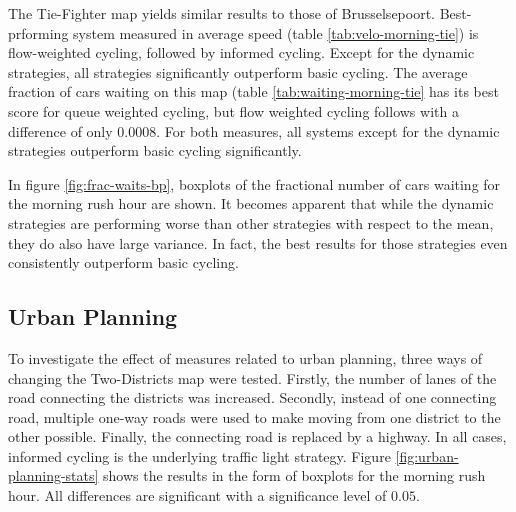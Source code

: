 \documentclass[11pt]{article}
\begin{document}
The Tie-Fighter map yields similar results to those of Brusselsepoort. Best-prforming system measured in average speed (table \ref{tab:velo-morning-tie}) is flow-weighted cycling, followed by informed cycling. Except for the dynamic strategies, all strategies significantly outperform basic cycling. The average fraction of cars waiting on this map (table \ref{tab:waiting-morning-tie} has its best score for queue weighted cycling, but flow weighted cycling follows with a difference of only 0.0008. For both measures, all systems except for the dynamic strategies outperform basic cycling significantly.

\vspace{20pt}

In figure \ref{fig:frac-waits-bp}, boxplots of the fractional number of cars waiting for the morning rush hour are shown. It becomes apparent that while the dynamic strategies are performing worse than other strategies with respect to the mean, they do also have large variance. In fact, the best results for those strategies even consistently outperform basic cycling.

\subsection{Urban Planning}
To investigate the effect of measures related to urban planning, three ways of changing the Two-Districts map were tested. Firstly, the number of lanes of the road connecting the districts was increased. Secondly, instead of one connecting road, multiple one-way roads were used to make moving from one district to the other possible. Finally, the connecting road is replaced by a highway. In all cases, informed cycling is the underlying traffic light strategy. Figure \ref{fig:urban-planning-stats} shows the results in the form of boxplots for the morning rush hour. All differences are significant with a significance level of $0.05$.
\end{document}
